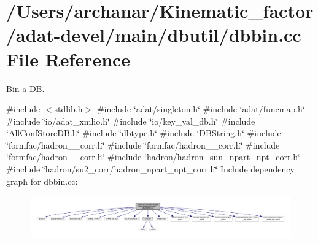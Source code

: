 \hypertarget{adat-devel_2main_2dbutil_2dbbin_8cc}{}\section{/\+Users/archanar/\+Kinematic\+\_\+factor/adat-\/devel/main/dbutil/dbbin.cc File Reference}
\label{adat-devel_2main_2dbutil_2dbbin_8cc}


Bin a DB.  


{\ttfamily \#include $<$stdlib.\+h$>$}\newline
{\ttfamily \#include \char`\"{}adat/singleton.\+h\char`\"{}}\newline
{\ttfamily \#include \char`\"{}adat/funcmap.\+h\char`\"{}}\newline
{\ttfamily \#include \char`\"{}io/adat\+\_\+xmlio.\+h\char`\"{}}\newline
{\ttfamily \#include \char`\"{}io/key\+\_\+val\+\_\+db.\+h\char`\"{}}\newline
{\ttfamily \#include \char`\"{}All\+Conf\+Store\+D\+B.\+h\char`\"{}}\newline
{\ttfamily \#include \char`\"{}dbtype.\+h\char`\"{}}\newline
{\ttfamily \#include \char`\"{}D\+B\+String.\+h\char`\"{}}\newline
{\ttfamily \#include \char`\"{}formfac/hadron\+\_\+1pt\+\_\+corr.\+h\char`\"{}}\newline
{\ttfamily \#include \char`\"{}formfac/hadron\+\_\+2pt\+\_\+corr.\+h\char`\"{}}\newline
{\ttfamily \#include \char`\"{}formfac/hadron\+\_\+3pt\+\_\+corr.\+h\char`\"{}}\newline
{\ttfamily \#include \char`\"{}hadron/hadron\+\_\+sun\+\_\+npart\+\_\+npt\+\_\+corr.\+h\char`\"{}}\newline
{\ttfamily \#include \char`\"{}hadron/su2\+\_\+corr/hadron\+\_\+npart\+\_\+npt\+\_\+corr.\+h\char`\"{}}\newline
Include dependency graph for dbbin.\+cc\+:
\nopagebreak
\begin{figure}[H]
\begin{center}
\leavevmode
\includegraphics[width=350pt]{d2/de6/adat-devel_2main_2dbutil_2dbbin_8cc__incl}
\end{center}
\end{figure}
